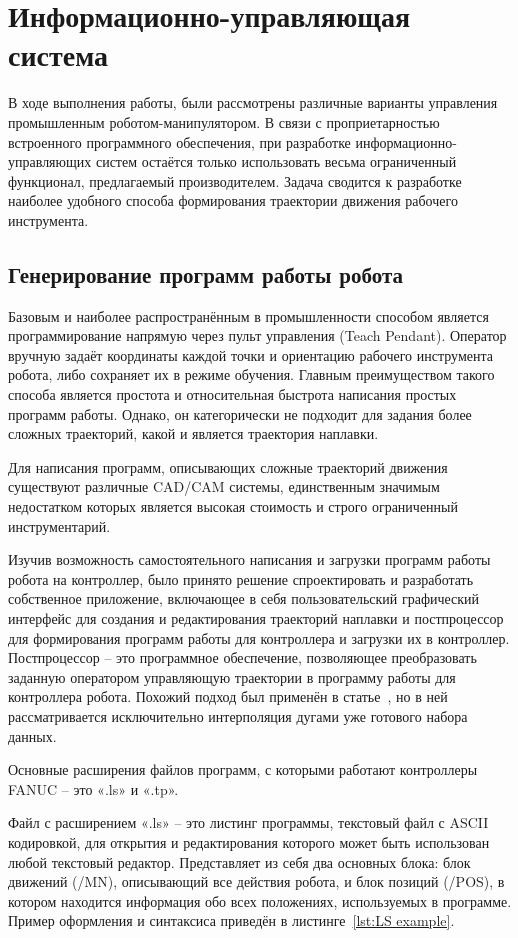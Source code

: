 \chapter{Информационно-управляющая система}
В ходе выполнения работы, были рассмотрены различные варианты управления промышленным роботом-манипулятором.
В связи с проприетарностью встроенного программного обеспечения, при разработке информационно-управляющих систем остаётся только использовать весьма ограниченный функционал, предлагаемый производителем.
Задача сводится к разработке наиболее удобного способа формирования траектории движения рабочего инструмента.


\section{Генерирование программ работы робота}
Базовым и наиболее распространённым в промышленности способом является программирование напрямую через пульт управления (Teach Pendant).
Оператор вручную задаёт координаты каждой точки и ориентацию рабочего инструмента робота, либо сохраняет их в режиме обучения.
Главным преимуществом такого способа является простота и относительная быстрота написания простых программ работы.
Однако, он категорически не подходит для задания более сложных траекторий, какой и является траектория наплавки.

Для написания программ, описывающих сложные траекторий движения существуют различные CAD/CAM системы, единственным значимым недостатком которых является высокая стоимость и строго ограниченный инструментарий.

Изучив возможность самостоятельного написания и загрузки программ работы робота на контроллер, было принято решение спроектировать и разработать собственное приложение, включающее в себя пользовательский графический интерфейс для создания и редактирования траекторий наплавки и постпроцессор для формирования программ работы для контроллера и загрузки их в контроллер.
Постпроцессор -- это программное обеспечение, позволяющее преобразовать заданную оператором управляющую траектории в программу работы для контроллера робота.
Похожий подход был применён в статье~\cite{Nagata_2017}, но в ней рассматривается исключительно интерполяция дугами уже готового набора данных.

Основные расширения файлов программ, с которыми работают контроллеры FANUC -- это «.ls» и «.tp».

Файл с расширением «.ls» -- это листинг программы, текстовый файл с ASCII кодировкой, для открытия и редактирования которого может быть использован любой текстовый редактор.
Представляет из себя два основных блока: блок движений (/MN), описывающий все действия робота, и блок позиций (/POS), в котором находится информация обо всех положениях, используемых в программе.
Пример оформления и синтаксиса приведён в листинге~\ref{lst:LS example}.


